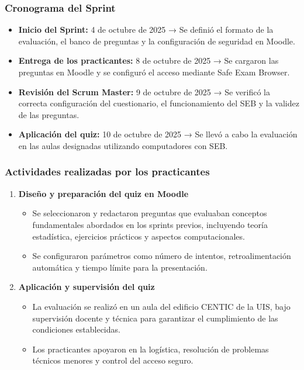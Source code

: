 \documentclass[letter,oneside,12pt,spanish]{report}
\begin{document}
\subsubsection*{Cronograma del Sprint}
\begin{itemize}
	\item \textbf{Inicio del Sprint:} 4 de octubre de 2025 → Se definió el formato de la evaluación, el banco de preguntas y la configuración de seguridad en Moodle.
	\item \textbf{Entrega de los practicantes:} 8 de octubre de 2025 → Se cargaron las preguntas en Moodle y se configuró el acceso mediante Safe Exam Browser.
	\item \textbf{Revisión del Scrum Master:} 9 de octubre de 2025 → Se verificó la correcta configuración del cuestionario, el funcionamiento del SEB y la validez de las preguntas.
	\item \textbf{Aplicación del quiz:} 10 de octubre de 2025 → Se llevó a cabo la evaluación en las aulas designadas utilizando computadores con SEB.
\end{itemize}

\subsubsection*{Actividades realizadas por los practicantes}

\begin{enumerate}
	\item \textbf{Diseño y preparación del quiz en Moodle}  
	\begin{itemize}
		\item Se seleccionaron y redactaron preguntas que evaluaban conceptos fundamentales abordados en los sprints previos, incluyendo teoría estadística, ejercicios prácticos y aspectos computacionales.
		\item Se configuraron parámetros como número de intentos, retroalimentación automática y tiempo límite para la presentación.
	\end{itemize}
	
	
	\item \textbf{Aplicación y supervisión del quiz}  
	\begin{itemize}
		\item La evaluación se realizó en un aula del edificio CENTIC de la UIS, bajo supervisión docente y técnica para garantizar el cumplimiento de las condiciones establecidas.
		\item Los practicantes apoyaron en la logística, resolución de problemas técnicos menores y control del acceso seguro.
	\end{itemize}
\end{enumerate}
\end{document}
